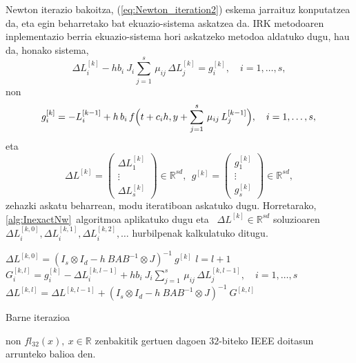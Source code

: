 Newton iterazio bakoitza, (\ref{eq:Newton_iteration2}) eskema jarraituz konputatzea da, eta egin beharretako bat ekuazio-sistema askatzea da. IRK metodoaren inplementazio berria ekuazio-sistema hori askatzeko metodoa aldatuko dugu, hau da, honako sistema,
\begin{equation}
\label{eq:linsysZ}
 \Delta L_{i}^{[k]}  - h b_i \ J_i \sum_{j=1}^{s}\, \mu_{ij} \, \Delta L_{j}^{[k]} = g_i^{[k]}, \quad  i=1 ,\ldots, s, 
\end{equation}
non
\begin{equation}
\label{eq:gk}
g_i^{[k]} = -L_{i}^{[k-1]}  + h \, b_i\, f\Big(t+c_i h,  y+\sum_{j=1}^{s}\, \mu_{ij}\, L_{j}^{[k-1]}\Big), \quad  i=1 ,\ldots, s, \\
\end{equation}
eta
\begin{equation*}
\Delta L^{[k]}= \left(
\begin{matrix}
\Delta L_1^{[k]}\\
\vdots\\
\Delta L_s^{[k]}
\end{matrix}
\right) \in \mathbb{R}^{sd}, \ \
g^{[k]}= \left(
\begin{matrix}
g_1^{[k]} \\
\vdots\\
g_s^{[k]}
\end{matrix}
\right) \in \mathbb{R}^{sd},
\end{equation*}
%
zehazki askatu beharrean, modu iteratiboan askatuko dugu. Horretarako,  \ref{alg:InexactNw}~algoritmoa aplikatuko dugu eta ~$\Delta L^{[k]} \in \mathbb{R}^{sd}$ soluzioaren  $ \Delta L_{i}^{[k,0]},  \Delta L_{i}^{[k,1]},  \Delta L_{i}^{[k,2]}, \ldots$ hurbilpenak kalkulatuko ditugu. 

\begin{algorithm}[H]
  $ \Delta L^{[k,0]} = (I_s \otimes I_d - h \ BAB^{-1} \otimes J)^{-1} \ g^{[k]}$\;
  \BlankLine
  {
   \BlankLine
   $l=l+1$\;
   $G_i^{[k,l]} = g_i^{[k]} - \Delta L_{i}^{[k,l-1]}  + h b_i \ J_i \sum_{j=1}^{s}\, \mu_{ij} \, \Delta L_{j}^{[k,l-1]},  \quad  i=1 ,\ldots, s$\;
   \BlankLine
   $\Delta L^{[k,l]}=\Delta L^{[k,l-1]}+ (I_s \otimes I_d - h \ BAB^{-1} \otimes J)^{-1} \ G^{[k,l]}$\;
  }
 \caption{Barne iterazioa}
 \label{alg:InexactNw}
\end{algorithm}

non $fl_{32}(x), \ x \in \mathbb{R}$ zenbakitik gertuen dagoen $32$-biteko IEEE doitasun arrunteko balioa den.

